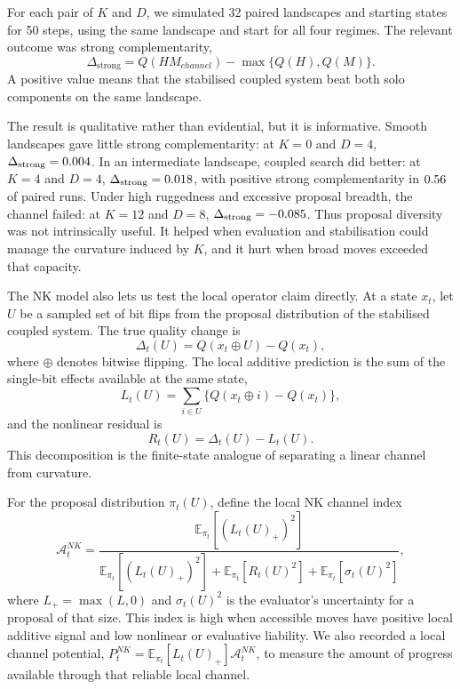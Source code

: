 \documentclass[11pt]{article}
\newcommand{\E}{\mathbb{E}}
\newcommand{\DeltaStrong}{\Delta_{\mathrm{strong}}}
\newcommand{\ANK}{\mathcal{A}^{NK}}
\newcommand{\PNK}{P^{NK}}
\begin{document}
For each pair of $K$ and $D$, we simulated 32 paired landscapes and starting states for 50 steps, using the same landscape and start for all four regimes. The relevant outcome was strong complementarity,
\begin{equation}
    \DeltaStrong = Q(HM_{channel}) - \max\{Q(H),Q(M)\}.
\end{equation}
A positive value means that the stabilised coupled system beat both solo components on the same landscape.

The result is qualitative rather than evidential, but it is informative. Smooth landscapes gave little strong complementarity: at $K=0$ and $D=4$, $\DeltaStrong=\NKDeltaSmooth$. In an intermediate landscape, coupled search did better: at $K=4$ and $D=4$, $\DeltaStrong=\NKDeltaIntermediate$, with positive strong complementarity in $0.56$ of paired runs. Under high ruggedness and excessive proposal breadth, the channel failed: at $K=12$ and $D=8$, $\DeltaStrong=\NKDeltaHighBroad$. Thus proposal diversity was not intrinsically useful. It helped when evaluation and stabilisation could manage the curvature induced by $K$, and it hurt when broad moves exceeded that capacity.

The NK model also lets us test the local operator claim directly. At a state $x_t$, let $U$ be a sampled set of bit flips from the proposal distribution of the stabilised coupled system. The true quality change is
\begin{equation}
    \Delta_t(U)=Q(x_t \oplus U)-Q(x_t),
\end{equation}
where $\oplus$ denotes bitwise flipping. The local additive prediction is the sum of the single-bit effects available at the same state,
\begin{equation}
    L_t(U)=\sum_{i\in U} \{Q(x_t \oplus i)-Q(x_t)\},
\end{equation}
and the nonlinear residual is
\begin{equation}
    R_t(U)=\Delta_t(U)-L_t(U).
\end{equation}
This decomposition is the finite-state analogue of separating a linear channel from curvature.

For the proposal distribution $\pi_t(U)$, define the local NK channel index
\begin{equation}
    \ANK_t =
    \frac{\E_{\pi_t}[(L_t(U)_+)^2]}
    {\E_{\pi_t}[(L_t(U)_+)^2]+\E_{\pi_t}[R_t(U)^2]+\E_{\pi_t}[\sigma_t(U)^2]},
    \label{eq:nk_local_channel}
\end{equation}
where $L_+=\max(L,0)$ and $\sigma_t(U)^2$ is the evaluator's uncertainty for a proposal of that size. This index is high when accessible moves have positive local additive signal and low nonlinear or evaluative liability. We also recorded a local channel potential, $\PNK_t=\E_{\pi_t}[L_t(U)_+]\ANK_t$, to measure the amount of progress available through that reliable local channel.
\end{document}
